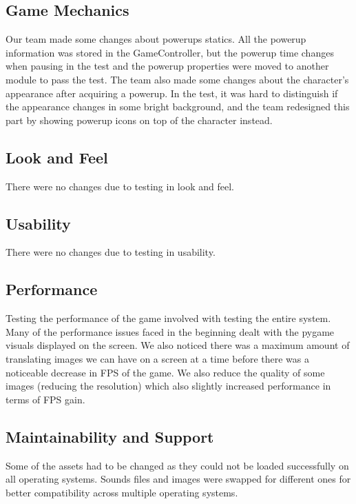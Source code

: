 \documentclass[12pt, titlepage]{article}
\begin{document}
\subsection{Game Mechanics}
Our team made some changes about powerups statics. All the powerup information was stored in the GameController, but the powerup time changes when pausing in the test and the powerup properties were moved to another module to pass the test. The team also made some changes about the character's appearance after acquiring a powerup. In the test, it was hard to distinguish if the appearance changes in some bright background, and the team redesigned this part by showing powerup icons on top of the character instead. 

\subsection{Look and Feel}
There were no changes due to testing in look and feel.

\subsection{Usability}
 There were no changes due to testing in usability.
 
\subsection{Performance}
Testing the performance of the game involved with testing the entire system. Many of the performance issues faced in the beginning dealt with the pygame visuals displayed on the screen. We also noticed there was a maximum amount of translating images we can have on a screen at a time before there was a noticeable decrease in FPS of the game. We also reduce the quality of some images (reducing the resolution) which also slightly increased performance in terms of FPS gain. 

\subsection{Maintainability and Support}
Some of the assets had to be changed as they could not be loaded successfully on all operating systems. Sounds files and images were swapped for different ones for better compatibility across multiple operating systems. 
\end{document}
